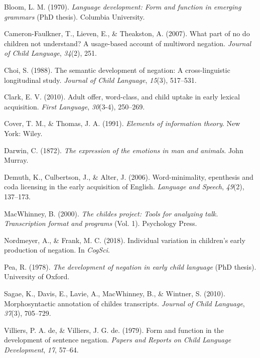 \documentclass[
  english,
  man,floatsintext]{apa6}
\begin{document}
\begingroup
\setlength{\parindent}{-0.5in}
\setlength{\leftskip}{0.5in}

\endgroup

\hypertarget{refs}{}
\leavevmode\hypertarget{ref-bloom1970language}{}%
Bloom, L. M. (1970). \emph{Language development: Form and function in emerging grammars} (PhD thesis). Columbia University.

\leavevmode\hypertarget{ref-cameron2007part}{}%
Cameron-Faulkner, T., Lieven, E., \& Theakston, A. (2007). What part of no do children not understand? A usage-based account of multiword negation. \emph{Journal of Child Language}, \emph{34}(2), 251.

\leavevmode\hypertarget{ref-choi1988semantic}{}%
Choi, S. (1988). The semantic development of negation: A cross-linguistic longitudinal study. \emph{Journal of Child Language}, \emph{15}(3), 517--531.

\leavevmode\hypertarget{ref-clark2010adult}{}%
Clark, E. V. (2010). Adult offer, word-class, and child uptake in early lexical acquisition. \emph{First Language}, \emph{30}(3-4), 250--269.

\leavevmode\hypertarget{ref-cover_elements_1991}{}%
Cover, T. M., \& Thomas, J. A. (1991). \emph{Elements of information theory}. New York: Wiley.

\leavevmode\hypertarget{ref-darwin1872expression}{}%
Darwin, C. (1872). \emph{The expression of the emotions in man and animals}. John Murray.

\leavevmode\hypertarget{ref-demuth2006word}{}%
Demuth, K., Culbertson, J., \& Alter, J. (2006). Word-minimality, epenthesis and coda licensing in the early acquisition of English. \emph{Language and Speech}, \emph{49}(2), 137--173.

\leavevmode\hypertarget{ref-macwhinney2000childes}{}%
MacWhinney, B. (2000). \emph{The childes project: Tools for analyzing talk. Transcription format and programs} (Vol. 1). Psychology Press.

\leavevmode\hypertarget{ref-nordmeyer2018individual}{}%
Nordmeyer, A., \& Frank, M. C. (2018). Individual variation in children's early production of negation. In \emph{CogSci}.

\leavevmode\hypertarget{ref-pea1978}{}%
Pea, R. (1978). \emph{The development of negation in early child language} (PhD thesis). University of Oxford.

\leavevmode\hypertarget{ref-sagae2010morphosyntactic}{}%
Sagae, K., Davis, E., Lavie, A., MacWhinney, B., \& Wintner, S. (2010). Morphosyntactic annotation of childes transcripts. \emph{Journal of Child Language}, \emph{37}(3), 705--729.

\leavevmode\hypertarget{ref-de1979form}{}%
Villiers, P. A. de, \& Villiers, J. G. de. (1979). Form and function in the development of sentence negation. \emph{Papers and Reports on Child Language Development}, \emph{17}, 57--64.
\end{document}
